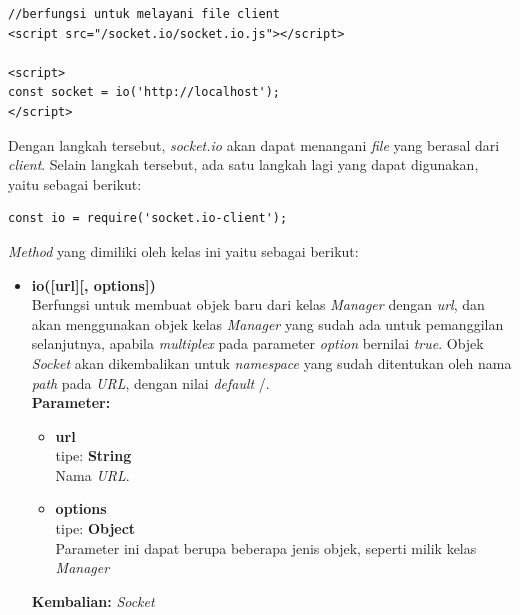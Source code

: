 \documentclass[a4paper,twoside]{article}
\begin{document}
\begin{enumerate}
\begin{enumerate}
\begin{enumerate}
\begin{lstlisting}
//berfungsi untuk melayani file client
<script src="/socket.io/socket.io.js"></script>
			
<script>
const socket = io('http://localhost');
</script>
\end{lstlisting}
			Dengan langkah tersebut, \textit{socket.io} akan dapat menangani \textit{file} yang berasal dari \textit{client}. Selain langkah tersebut, ada satu langkah lagi yang dapat digunakan, yaitu sebagai berikut:
\begin{lstlisting}
const io = require('socket.io-client');
\end{lstlisting}
			
			\textit{Method} yang dimiliki oleh kelas ini yaitu sebagai berikut:
			\begin{itemize}
				\item \textbf{io([url][, options])} \\
				Berfungsi untuk membuat objek baru dari kelas \textit{Manager} dengan \textit{url}, dan akan menggunakan objek kelas \textit{Manager} yang sudah ada untuk pemanggilan selanjutnya, apabila \textit{multiplex} pada parameter \textit{option} bernilai \textit{true}. Objek \textit{Socket} akan dikembalikan untuk \textit{namespace} yang sudah ditentukan oleh nama \textit{path} pada \textit{URL}, dengan nilai \textit{default} /. \\
				\textbf{Parameter:}
				\begin{itemize}
					\item \textbf{url} \\tipe: \textbf{String} \\ Nama \textit{URL}.
					\item \textbf{options} \\tipe: \textbf{Object} \\ Parameter ini dapat berupa beberapa jenis objek, seperti milik kelas \textit{Manager}
				\end{itemize}
				\textbf{Kembalian:} \textit{Socket}
				
			\end{itemize}
			

\end{enumerate}
\end{enumerate}
\end{enumerate}
\end{document}
